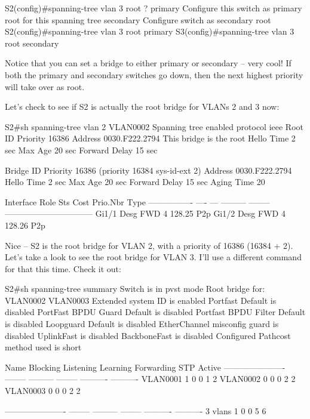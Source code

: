 \begin{cli}
S2(config)#spanning-tree vlan 3 root ?
  primary    Configure this switch as primary root for this spanning tree
  secondary  Configure switch as secondary root
S2(config)#spanning-tree vlan 3 root primary
S3(config)#spanning-tree vlan 3 root secondary
\end{cli}

Notice that you can
set a bridge to either primary or secondary -- very cool! If both the
primary and secondary switches go down, then the next highest priority
will take over as root.

Let's check to see if S2 is actually the root bridge for VLANs 2 and 3
now:

\begin{cli}
S2#sh spanning-tree vlan 2
VLAN0002
  Spanning tree enabled protocol ieee
  Root ID    Priority    16386
             Address     0030.F222.2794
             This bridge is the root
             Hello Time  2 sec  Max Age 20 sec  Forward Delay 15 sec
 
  Bridge ID  Priority    16386  (priority 16384 sys-id-ext 2)
             Address     0030.F222.2794
             Hello Time  2 sec  Max Age 20 sec  Forward Delay 15 sec
             Aging Time  20
 
Interface        Role Sts Cost      Prio.Nbr Type
---------------- ---- --- --------- -------- --------------------------------
Gi1/1            Desg FWD 4         128.25   P2p
Gi1/2            Desg FWD 4         128.26   P2p
\end{cli}

Nice -- S2 is the root bridge for VLAN 2, with a priority of 16386 (16384
+ 2). Let's take a look to see the root bridge for VLAN 3. I'll use a
different command for that this time. Check it out:

\begin{cli}
S2#sh spanning-tree summary
Switch is in pvst mode
Root bridge for: VLAN0002 VLAN0003
Extended system ID           is enabled
Portfast Default             is disabled
PortFast BPDU Guard Default  is disabled
Portfast BPDU Filter Default is disabled
Loopguard Default            is disabled
EtherChannel misconfig guard is disabled
UplinkFast                   is disabled
BackboneFast                 is disabled
Configured Pathcost method used is short
 
Name                   Blocking Listening Learning Forwarding STP Active
---------------------- -------- --------- -------- ---------- ----------
VLAN0001                     1         0        0          1          2
VLAN0002                     0         0        0          2          2
VLAN0003                     0         0        0          2          2
 
---------------------- -------- --------- -------- ---------- ----------
3 vlans                      1         0        0          5          6
\end{cli}


